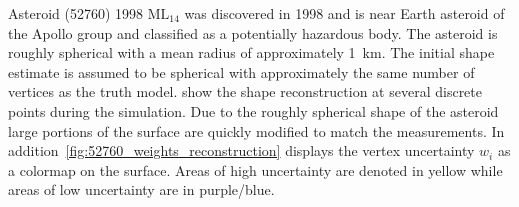 Asteroid (\num{52760}) \num{1998} \(\text{ML}_{14}\) was discovered in \num{1998} and is near Earth asteroid of the Apollo group and classified as a potentially hazardous body.
The asteroid is roughly spherical with a mean radius of approximately \SI{1}{\kilo\meter}.
The initial shape estimate is assumed to be spherical with approximately the same number of vertices as the truth model.
 show the shape reconstruction at several discrete points during the simulation.
Due to the roughly spherical shape of the asteroid large portions of the surface are quickly modified to match the measurements.
In addition~\cref{fig:52760_weights_reconstruction} displays the vertex uncertainty \( w_i \) as a colormap on the surface. 
Areas of high uncertainty are denoted in yellow while areas of low uncertainty are in purple/blue.

